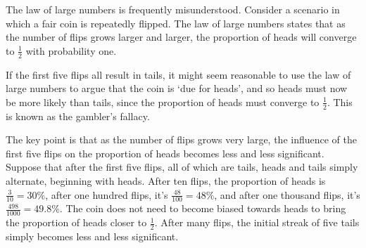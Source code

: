 \par
The law of large numbers is frequently misunderstood. Consider a scenario in which a fair coin is repeatedly flipped. The law of large numbers states that as the number of flips grows larger and larger, the proportion of heads will converge to $\frac{1}{2}$ with probability one.
\par
If the first five flips all result in tails, it might seem reasonable to use the law of large numbers to argue that the coin is `due for heads', and so heads must now be more likely than tails, since the proportion of heads must converge to $\frac{1}{2}$. This is known as the gambler's fallacy.
\par
The key point is that as the number of flips grows very large, the influence of the first five flips on the proportion of heads becomes less and less significant. Suppose that after the first five flips, all of which are tails, heads and tails simply alternate, beginning with heads. After ten flips, the proportion of heads is $\frac{3}{10} = 30\%$, after one hundred flips, it's $\frac{48}{100} = 48\%$, and after one thousand flips, it's $\frac{498}{1000} = 49.8\%$. The coin does not need to become biased towards heads to bring the proportion of heads closer to $\frac{1}{2}$. After many flips, the initial streak of five tails simply becomes less and less significant.

